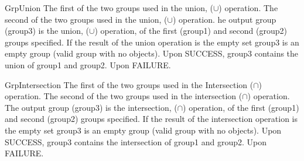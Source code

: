 \begin{prototype}{GrpUnion}
		{\pInput}{The first of the two groups used in the union, ($\cup$) operation.}
		{\pInput}{The second of the two groups used in the union, ($\cup$) operation.}
		{\pOutput}{he output group (group3) is the union, ($\cup$) operation, of the first (group1) and second (group2) groups specified. If the result of the union operation is the empty set group3 is an empty group (valid group with no objects).}
	 	{Upon SUCCESS, group3 contains the union of group1 and group2.}
	 	{Upon FAILURE.}
\end{prototype}

\begin{prototype}{GrpIntersection}
		{\pInput}{The first of the two groups used in the Intersection ($\cap$)  operation.}
		{\pInput}{The second of the two groups used in the intersection ($\cap$) operation.}
		{\pOutput}{The output group (group3) is the intersection, ($\cap$) operation, of the first (group1) and second (group2) groups specified. If the result of the intersection operation is the empty set group3 is an empty group (valid group with no objects).}
	 	{Upon SUCCESS, group3 contains the intersection of group1 and group2.}
	 	{Upon FAILURE.}
\end{prototype}

